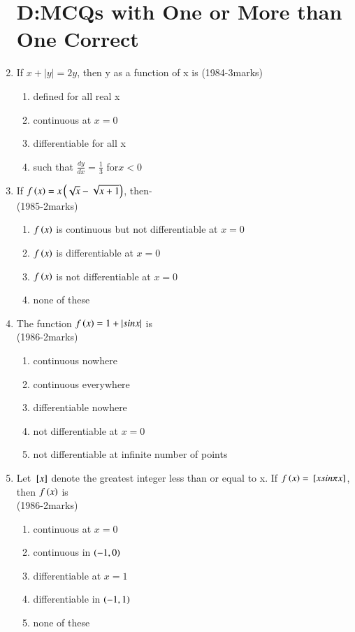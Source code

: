 \documentclass[journal,12pt,twocolumn]{IEEEtran}
\theoremstyle{remark}
\begin{document}
\begin{enumerate}
\section{D:MCQs with One or More than One Correct}
\item If $x+|y|=2y$, then y as a function of x is
\hfill{(1984-3marks)} 
\begin{enumerate}[label=\alph*)]
    \item defined for all real x
    \item continuous at $x=0$
    \item differentiable for all x
    \item such that $\frac{dy}{dx}=\frac{1}{3}$ for$x<0$ \\
\end{enumerate}
\item If $f\left(x\right)=x\left(\sqrt{x}-\sqrt{x+1}\right)$, then- \\
\hfill{(1985-2marks)} 
\begin{enumerate}[label=\alph*)]
	\item $f\left(x\right)$ is continuous but not differentiable at $x=0$
	\item $f\left(x\right)$ is differentiable at $x=0$
	\item $f\left(x\right)$ is not differentiable at $x=0$
	\item none of these \\
\end{enumerate}
\item The function $f\left(x\right)=1+|sinx|$ is \\
\hfill{(1986-2marks)} 
\begin{enumerate}[label=\alph*)]
    \item continuous nowhere
    \item continuous everywhere
    \item differentiable nowhere 
    \item not differentiable at $x=0$
    \item not differentiable at infinite number of points \\
\end{enumerate} 
\item Let ${}\left[x\right]$ denote the greatest integer less than or equal to x. If $f\left(x\right)={}\left[xsin \pi x\right]$, then $f\left(x\right)$ is \\
\hfill{(1986-2marks)} 
\begin{enumerate}[label=\alph*)]
    \item continuous at $x=0$
    \item continuous in $\left(-1,0\right)$
    \item differentiable at $x=1$ 
    \item differentiable in $\left(-1,1\right)$ 
    \item none of these \\
\end{enumerate}


\end{enumerate}
\end{document}
